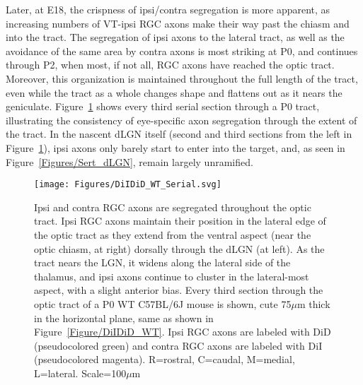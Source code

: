 Later, at E18, the crispness of ipsi/contra segregation is more apparent, as increasing numbers of VT-ipsi RGC axons make their way past the chiasm and into the tract.
The segregation of ipsi axons to the lateral tract, as well as the avoidance of the same area by contra axons is most striking at P0, and continues through P2, when most, if not all, RGC axons have reached the optic tract.
Moreover, this organization is maintained throughout the full length of the tract, even while the tract as a whole changes shape and flattens out as it nears the geniculate.
Figure~\ref{Figures/DiIDiD_WT_Serial} shows every third serial section through a P0 tract, illustrating the consistency of eye-specific axon segregation through the extent of the tract.
In the nascent dLGN itself (second and third sections from the left in Figure~\ref{Figures/DiIDiD_WT_Serial}), ipsi axons only barely start to enter into the target, and, as seen in Figure~\ref{Figures/Sert_dLGN}, remain largely unramified.

\begin{figure}[hbtp]
	\begin{center}
		\texttt{[image: Figures/DiIDiD\_WT\_Serial.svg]}
		\caption[Ipsi and contra RGC axons are segregated throughout the optic tract.]
		{Ipsi and contra RGC axons are segregated throughout the optic tract.
		Ipsi RGC axons maintain their position in the lateral edge of the optic tract as they extend from the ventral aspect (near the optic chiasm, at right) dorsally through the dLGN (at left).
		As the tract nears the LGN, it widens along the lateral side of the thalamus, and ipsi axons continue to cluster in the lateral-most aspect, with a slight anterior bias.
		Every third section through the optic tract of a P0 WT C57BL/6J mouse is shown, cute 75$\mu$m thick in the horizontal plane, same as shown in Figure~\ref{Figure/DiIDiD_WT}.
		Ipsi RGC axons are labeled with DiD (pseudocolored green) and contra RGC axons are labeled with DiI (pseudocolored magenta).
		R=rostral, C=caudal, M=medial, L=lateral. Scale=100$\mu$m}
		\label{Figures/DiIDiD_WT_Serial}
	\end{center}
\end{figure}

